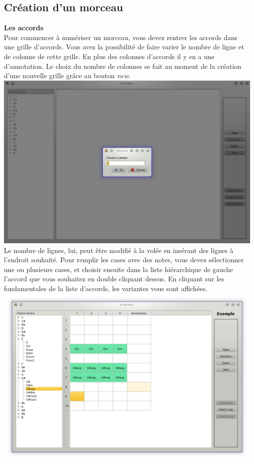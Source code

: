\documentclass[a4paper]{article}
\begin{document}
\subsection{Création d'un morceau}
\textbf{Les accords}\\
Pour commencer à numériser un morceau, vous devez rentrer les accords dans une grille d'accords. 
Vous avez la possibilité de faire varier le nombre de ligne et de colonne de cette grille. 
En plus des colonnes d'accords il y en a une d'annotation.
Le choix du nombre de colonnes se fait au moment de la création d'une nouvelle grille grâce au bouton \textit{new}.\\
\includegraphics[scale=0.5]{manulutil3.png}\\
Le nombre de lignes, lui, peut être modifié à la volée en insérant des lignes à l'endroit souhaité.
Pour remplir les cases avec des notes, vous devez sélectionner une ou plusieurs cases, et choisir ensuite dans la liste hiérarchique de gauche l'accord que vous souhaitez en double cliquant dessus. 
En cliquant sur les fondamentales de la liste d'accords, les variantes vous sont affichées.\\
\includegraphics[scale=0.5]{manulutil4.png}\\
\end{document}
